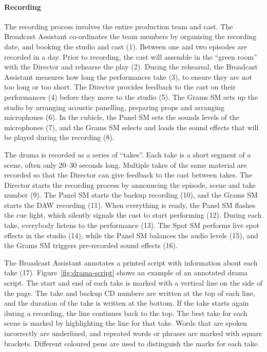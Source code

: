 \paragraph{Recording}
The recording process involves the entire production team and cast. The Broadcast Assistant co-ordinates the team
members by organising the recording date, and booking the studio and cast (1). Between one and two episodes are
recorded in a day.  Prior to recording, the cast will assemble in the ``green room'' with the Director and rehearse the
play (2). During the rehearsal, the Broadcast Assistant measures how long the performances take (3), to ensure they are
not too long or too short.  The Director provides feedback to the cast on their performances (4) before they move to
the studio (5). The Grams SM sets up the studio by arranging acoustic panelling, preparing props and arranging
microphones (6). In the cubicle, the Panel SM sets the sounds levels of the microphones (7), and the Grams SM selects
and loads the sound effects that will be played during the recording (8).

The drama is recorded as a series of ``takes''. Each take is a short segment of a scene, often only 20--30 seconds
long.  Multiple takes of the same material are recorded so that the Director can give feedback to the cast between
takes.  The Director starts the recording process by announcing the episode, scene and take number (9).  The Panel SM
starts the backup recording (10), and the Grams SM starts the DAW recording (11). When everything is ready, the Panel
SM flashes the cue light, which silently signals the cast to start performing (12).  During each take, everybody
listens to the performance (13). The Spot SM performs live spot effects in the studio (14), while the Panel SM balances
the audio levels (15), and the Grams SM triggers pre-recorded sound effects (16).

The Broadcast Assistant annotates a printed script with information about each take (17).  Figure~\ref{fig:drama-script}
shows an example of an annotated drama script.  The start and end of each take is marked with a vertical line on the
side of the page. The take and backup CD numbers are written at the top of each line, and the duration of the take is
written at the bottom.  If the take starts again during a recording, the line continues back to the top.  The best take
for each scene is marked by highlighting the line for that take.  Words that are spoken incorrectly are underlined, and
repeated words or phrases are marked with square brackets.  Different coloured pens are used to distinguish the marks
for each take.  

